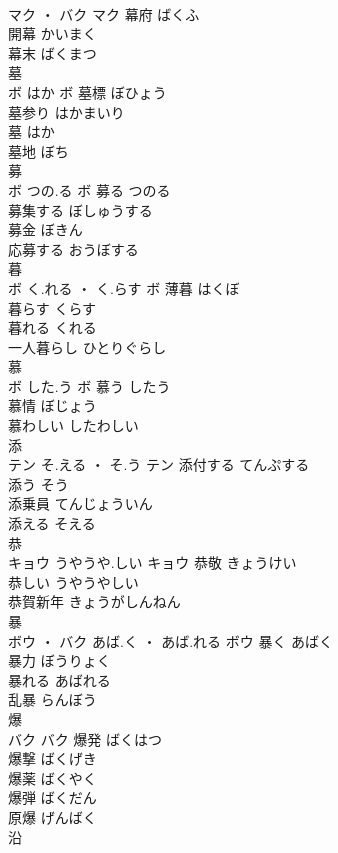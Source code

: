 \documentclass[8pt]{extreport}
\begin{document}
\begin{CJK}{UTF8}{min}
\\	マク ・ バク		マク	幕府	ばくふ	
\\	開幕	かいまく	
\\	幕末	ばくまつ	
\\	墓	
\\	ボ	はか	ボ	墓標	ぼひょう	
\\	墓参り	はかまいり	
\\	墓	はか	
\\	墓地	ぼち	
\\	募	
\\	ボ	つの.る	ボ	募る	つのる	
\\	募集する	ぼしゅうする	
\\	募金	ぼきん	
\\	応募する	おうぼする	
\\	暮	
\\	ボ	く.れる ・ く.らす	ボ	薄暮	はくぼ	
\\	暮らす	くらす	
\\	暮れる	くれる	
\\	一人暮らし	ひとりぐらし	
\\	慕	
\\	ボ	した.う	ボ	慕う	したう	
\\	慕情	ぼじょう	
\\	慕わしい	したわしい	
\\	添	
\\	テン	そ.える ・ そ.う	テン	添付する	てんぷする	
\\	添う	そう	
\\	添乗員	てんじょういん	
\\	添える	そえる	
\\	恭	
\\	キョウ	うやうや.しい	キョウ	恭敬	きょうけい	
\\	恭しい	うやうやしい	
\\	恭賀新年	きょうがしんねん	
\\	暴	
\\	ボウ ・ バク	あば.く ・ あば.れる	ボウ	暴く	あばく	
\\	暴力	ぼうりょく	
\\	暴れる	あばれる	
\\	乱暴	らんぼう	
\\	爆	
\\	バク		バク	爆発	ばくはつ	
\\	爆撃	ばくげき	
\\	爆薬	ばくやく	
\\	爆弾	ばくだん	
\\	原爆	げんばく	
\\	沿	

\end{CJK}
\end{document}
